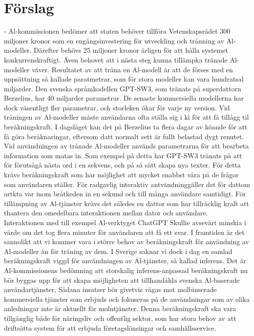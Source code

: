 {{{{{\section*{Förslag}
- Al-kommissionen bedömer att staten behöver tillföra Vetenskapsrådet 300 miljoner kronor som en engångsinvestering för utveckling och tränning av Al-modeller. Därefter behövs 25 miljoner kronor årligen för att hålla systemet konkurrenskraftigt.
Även behovet att i nästa steg kunna tillämpka trånade Al-modeller väver. Resultatet av att träna en Al-modell är att de förses med en uppsättning så kallade paratmetrar, som för stora modeller kan vara hundratsal miljarder. Den svenska språmkodellen GPT-SW3, som tränats på superdattorn Berzelius, har 40 miljarder parametrar. De senaste kommersiella modellerna har dock väsentligt fler parametrar, och storleken ökar för varje ny version.
Vid träningen av Al-modeller måste användarna ofta ställa sig i ki för att få tillågg til beråkningskraft. I dagslåget kan det på Berzelius ta flera dagar av köande för att få göra beråknaringar, eftersom datt normalt sett är fullt belastad dygt renutet.
Vid användningen av trånade Al-modeller används parametrarna för att bearbeta information som matas in. Som exempel på detta har GPT-SW3 tränats på att för förutsågå nästa ord i en sekvens, och på så sätt skapa nya texter. För detta krävs beråkningskraft som har möjlighet att mycket snabbst våra på de frågor som användaren ställer. För radgavlig interaktiv antvändninggäller det för dattom artkta var inom bråtkeden in en sekund och till många användare samtidigt.
För tillämpning av Al-tjänster krävs det således en dattor som har tillräcklig kraft att thantera den omedelbara interaktionen mellan dator och användare. Interaktionen med till exempel Al-verktyget ChatGPT Skullie avsevärt minskia i värde om det tog flera minuter för användaren att få ett svar. I framtiden är det sannolikt att vi kommer vara i större behov av beråkningskraft för användning av Al-modeller än för träning av dem.
I Sverige saknar vi dock i dag en samlad beräkningskraft viggd för användningen av Al-tjänster, så kallad inferens. Det är Al-kommissionens bedömning att storskalig inferens-anpassad beräkningskraft nu bör byggas upp för att skapa möjligheten att tillhandåhla svenska Al-baserade användartjänster, Sådana insatser bör givetvis vägas mot molbinserade kommersiella tjänster som erbjuds och fokuseras på de användningar som av olika anledningar inte är aktuellt för molntjänster. Denna beräkningskraft ska vara tillgånglig både för näringsliv och offentlig sektor, som har stora behov av att driftsätta system för att erbjuda företagslönsingar och samhällsservice.
}}}}}
